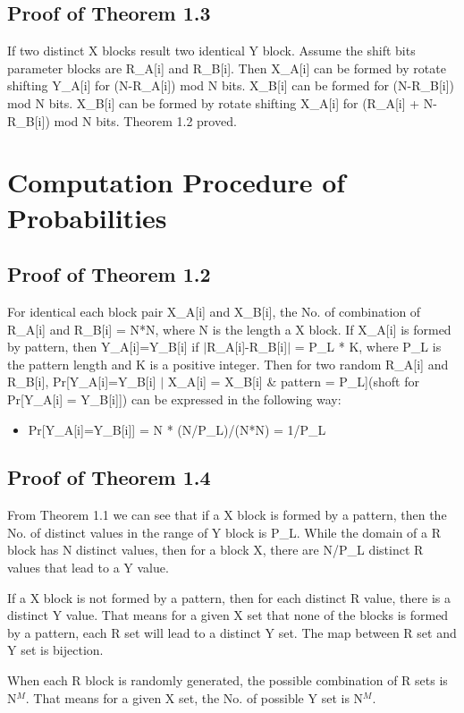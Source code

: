 \documentclass{article}
\begin{document}
\subsection{Proof of Theorem 1.3}
If two distinct X blocks result two identical Y block. Assume the shift bits parameter blocks are R\_A[i] and R\_B[i]. Then X\_A[i] can be formed by rotate shifting Y\_A[i] for (N-R\_A[i]) mod N bits. X\_B[i] can be formed for (N-R\_B[i]) mod N bits.
X\_B[i] can be formed by rotate shifting X\_A[i] for (R\_A[i] + N-R\_B[i]) mod N bits. Theorem 1.2 proved.

\section{Computation Procedure of Probabilities}
\subsection{Proof of Theorem 1.2}
For identical each block pair X\_A[i] and X\_B[i], the No. of combination of R\_A[i] and R\_B[i] = N*N, where N is the length a X block. 
If X\_A[i] is formed by pattern, then Y\_A[i]=Y\_B[i] if $\mid$R\_A[i]-R\_B[i]$\mid$ = P\_L * K, where P\_L is the pattern length and K is a positive integer. 
Then for two random R\_A[i] and R\_B[i], Pr[Y\_A[i]=Y\_B[i] $\mid$ X\_A[i] = X\_B[i] \& pattern = P\_L](shoft for Pr[Y\_A[i] = Y\_B[i]]) can be expressed in the following way:
\begin{itemize}
	\item Pr[Y\_A[i]=Y\_B[i]] = N * (N/P\_L)/(N*N) = 1/P\_L
\end{itemize} 

\subsection{Proof of Theorem 1.4}
From Theorem 1.1 we can see that if a X block is formed by a pattern, then the No. of distinct values in the range of Y block is P\_L. While the domain of a R block has N distinct values, then for a block X, there are N/P\_L distinct R values that lead to a Y value.

If a X block is not formed by a pattern, then for each distinct R value, there is a distinct Y value. That means for a given X set that none of the blocks is formed by a pattern, each R set will lead to a distinct Y set. The map between R set and Y set is bijection.

When each R block is randomly generated, the possible combination of R sets is N$^M$. That means for a given X set, the No. of possible Y set is N$^M$.
\end{document}
